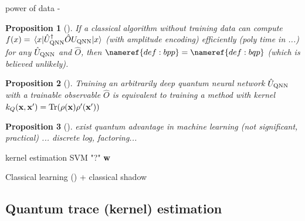 \documentclass[
10pt,
aps,
pra,
linenumbers,
floatfix,
]{revtex4-2}
\theoremstyle{plain}
\newtheorem{theorem}{Theorem}
\newtheorem{proposition}{Proposition}
\theoremstyle{definition}
\newcommand{\qnn}{\textup{QNN}}
\newcommand{\ob}{\hat{O}}
\newcommand{\U}{\hat{U}}
\newcommand{\dm}{\rho}
\begin{document}
power of data - 
\begin{proposition}[\cite{huangPowerDataQuantum2021}]
	If a classical algorithm without training data can compute $f(x)=\mel{x}{\U_{\textup{QNN}}^\dagger \ob U_{\textup{QNN}}}{x}$ (with amplitude encoding) efficiently (poly time in ...) for any $\U_{\textup{QNN}}$ and $\ob$, then $\nameref{def:bpp}=\nameref{def:bqp}$ (which is believed unlikely).
\end{proposition}
\begin{proposition}[\cite{huangPowerDataQuantum2021}]
	Training an arbitrarily deep quantum neural network $\U_{\qnn}$ with a trainable observable $\ob$ is equivalent to training a  method with kernel $k_{Q}(\vbx,\vbx')=\Tr(\dm(\vbx)\dm'(\vbx'))$
\end{proposition}
\begin{proposition}[\cite{huangPowerDataQuantum2021}]
	exist quantum advantage in machine learning (not significant, practical)	...
	discrete log, factoring...
\end{proposition}
\begin{algorithm}[H]
    \DontPrintSemicolon
    \BlankLine
     {
        kernel estimation 
        SVM 
    {\Return "?"}
    }
    \Return $\vb{w}$ 
    \caption{Classical learning () + classical shadow}
    \label{alg:classical_learning}
\end{algorithm}


\subsection{Quantum trace (kernel) estimation}
\end{document}
